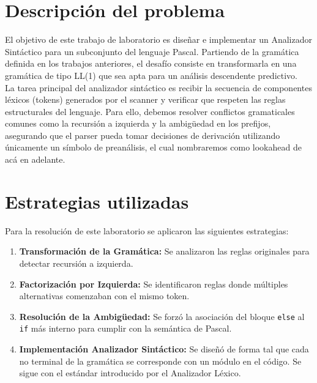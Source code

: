 \documentclass[12pt]{article}
\begin{document}
\pagebreak

\tableofcontents

\pagebreak

% 

\setlength{\grammarparsep}{12pt plus 1pt minus 1pt} %
\setlength{\grammarindent}{4em} %

\section{Descripción del problema}
El objetivo de este trabajo de laboratorio es diseñar e implementar un Analizador Sintáctico para un subconjunto del lenguaje Pascal. Partiendo de la gramática definida en los trabajos anteriores, el desafío consiste en transformarla en una gramática de tipo LL(1) que sea apta para un análisis descendente predictivo. \\

La tarea principal del analizador sintáctico es recibir la secuencia de componentes léxicos (tokens) generados por el scanner y verificar que respeten las reglas estructurales del lenguaje. Para ello, debemos resolver conflictos gramaticales comunes como la recursión a izquierda y la ambigüedad en los prefijos, asegurando que el parser pueda tomar decisiones de derivación utilizando únicamente un símbolo de preanálisis, el cual nombraremos como lookahead de acá en adelante.

\section{Estrategias utilizadas}
Para la resolución de este laboratorio se aplicaron las siguientes estrategias:

\begin{enumerate}
    \item \textbf{Transformación de la Gramática:} Se analizaron las reglas originales para detectar recursión a izquierda. 
    \item \textbf{Factorización por Izquierda:} Se identificaron reglas donde múltiples alternativas comenzaban con el mismo token. 
    \item \textbf{Resolución de la Ambigüedad:} Se forzó la asociación del bloque \texttt{else} al \texttt{if} más interno para cumplir con la semántica de Pascal.
    \item \textbf{Implementación Analizador Sintáctico:} Se diseñó de forma tal que cada no terminal de la gramática se corresponde con un módulo en el código. Se sigue con el estándar introducido por el Analizador Léxico. 
\end{enumerate}
\end{document}
